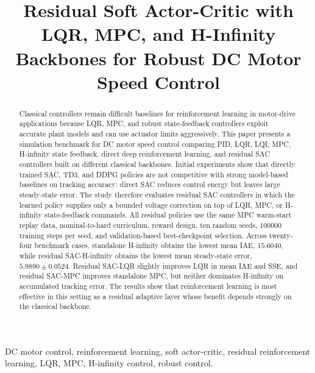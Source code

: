 \documentclass[conference]{IEEEtran}
\begin{document}
\title{Residual Soft Actor-Critic with LQR, MPC, and H-Infinity Backbones for Robust DC Motor Speed Control}

\author{
}

\maketitle

\begin{abstract}
Classical controllers remain difficult baselines for reinforcement learning in motor-drive applications because LQR, MPC, and robust state-feedback controllers exploit accurate plant models and can use actuator limits aggressively. This paper presents a simulation benchmark for DC motor speed control comparing PID, LQR, LQI, MPC, H-infinity state feedback, direct deep reinforcement learning, and residual SAC controllers built on different classical backbones. Initial experiments show that directly trained SAC, TD3, and DDPG policies are not competitive with strong model-based baselines on tracking accuracy: direct SAC reduces control energy but leaves large steady-state error. The study therefore evaluates residual SAC controllers in which the learned policy supplies only a bounded voltage correction on top of LQR, MPC, or H-infinity state-feedback commands. All residual policies use the same MPC warm-start replay data, nominal-to-hard curriculum, reward design, ten random seeds, $100000$ training steps per seed, and validation-based best-checkpoint selection. Across twenty-four benchmark cases, standalone H-infinity obtains the lowest mean IAE, $15.6040$, while residual SAC-H-infinity obtains the lowest mean steady-state error, $5.9890 \pm 0.0524$. Residual SAC-LQR slightly improves LQR in mean IAE and SSE, and residual SAC-MPC improves standalone MPC, but neither dominates H-infinity on accumulated tracking error. The results show that reinforcement learning is most effective in this setting as a residual adaptive layer whose benefit depends strongly on the classical backbone.
\end{abstract}

\begin{IEEEkeywords}
DC motor control, reinforcement learning, soft actor-critic, residual reinforcement learning, LQR, MPC, H-infinity control, robust control.
\end{IEEEkeywords}
\end{document}
